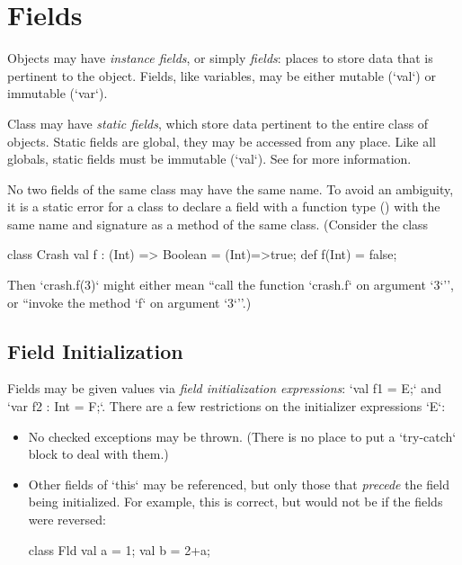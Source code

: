 \section{Fields}
\label{FieldDefinitions}

Objects may have {\em instance fields}, or simply {\em fields}: places to
store data that is pertinent to the object. Fields, like variables, may be
either mutable (\xcd`val`) or immutable (\xcd`var`).

Class may have {\em static fields}, which store data pertinent to the
entire class of objects.   Static fields are global, \viz{} they may be
accessed from any place.  Like all globals, static fields must be immutable
(\xcd`val`).  See  for more information.

No two fields of the same class may have the same name.
To avoid an ambiguity, it is a static error for a class to
declare a field with a function type () with
the same name and signature  as a method of the same class.  
(Consider the class 
\begin{xten}
class Crash {
  val f : (Int) => Boolean = (Int)=>true;
  def f(Int) = false;
}
\end{xten}
\noindent
Then \xcd`crash.f(3)` might either mean ``call the function \xcd`crash.f` on
argument \xcd`3`'', or ``invoke the method \xcd`f` on argument \xcd`3`''.)

\subsection{Field Initialization}

Fields may be given values via {\em field initialization expressions}: 
\xcd`val f1 = E;` and \xcd`var f2 : Int = F;`.  There are a few restrictions
on the initializer expressions \xcd`E`: 
\begin{itemize}
\item No checked exceptions may be thrown.  (There is no place to put a
      \xcd`try-catch` block to deal with them.)
\item Other fields of \xcd`this` may be referenced, but only those that {\em
      precede} the field being initialized.  For example, this is correct, but
      would not be if the fields were reversed: 
\begin{xten}
class Fld{
  val a = 1;
  val b = 2+a;
}
\end{xten}
%

\end{itemize}

